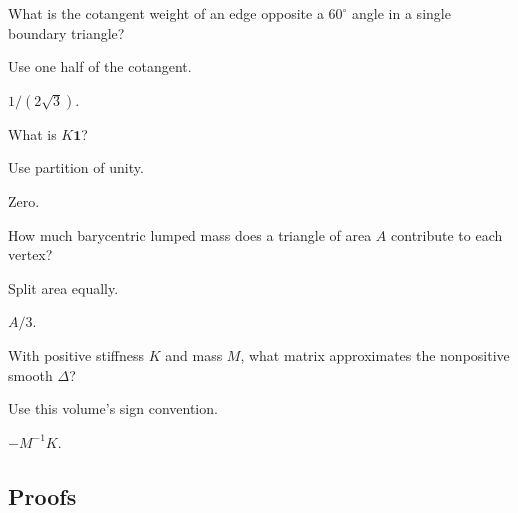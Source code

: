 \begin{exercise}\label{exr:vii41-ped-02}
What is the cotangent weight of an edge opposite a \(60^\circ\) angle in a single boundary triangle?
\end{exercise}

\begin{hint}
Use one half of the cotangent.
\end{hint}

\begin{solution}
\(1/(2\sqrt3)\).
\end{solution}

\begin{exercise}\label{exr:vii41-ped-03}
What is \(K\mathbf1\)?
\end{exercise}

\begin{hint}
Use partition of unity.
\end{hint}

\begin{solution}
Zero.
\end{solution}

\begin{exercise}\label{exr:vii41-ped-04}
How much barycentric lumped mass does a triangle of area \(A\) contribute to each vertex?
\end{exercise}

\begin{hint}
Split area equally.
\end{hint}

\begin{solution}
\(A/3\).
\end{solution}

\begin{exercise}\label{exr:vii41-ped-05}
With positive stiffness \(K\) and mass \(M\), what matrix approximates the nonpositive smooth \(\Delta\)?
\end{exercise}

\begin{hint}
Use this volume's sign convention.
\end{hint}

\begin{solution}
\(-M^{-1}K\).
\end{solution}

\subsection*{Proofs}


